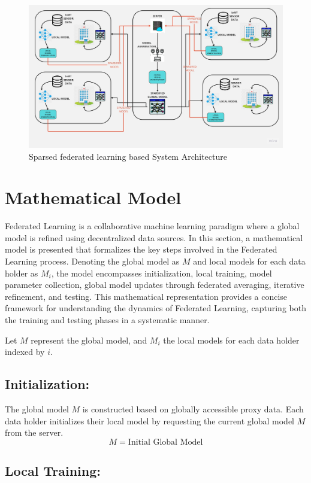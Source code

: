 \documentclass[conference]{IEEEtran}
\begin{document}
\begin{figure}[htp]
    \centering
    \includegraphics[scale = 0.12]{FL_ARCHITECTURE.jpg}
    \caption{Sparsed federated learning based System Architecture}
    \label{ds}
\end{figure}

\section{Mathematical Model}
Federated Learning is a collaborative machine learning paradigm where a global model is refined using decentralized data sources. In this section, a mathematical model is presented that formalizes the key steps involved in the Federated Learning process. Denoting the global model as \(M\) and local models for each data holder as \(M_i\), the model encompasses initialization, local training, model parameter collection, global model updates through federated averaging, iterative refinement, and testing. This mathematical representation provides a concise framework for understanding the dynamics of Federated Learning, capturing both the training and testing phases in a systematic manner.

Let \(M\) represent the global model, and \(M_i\) the local models for each data holder indexed by \(i\).

\subsection{Initialization:}
The global model \(M\) is constructed based on globally accessible proxy data. Each data holder initializes their local model by requesting the current global model \(M\) from the server.
\[ M = \text{Initial Global Model} \]

\subsection{Local Training:}
\end{document}
